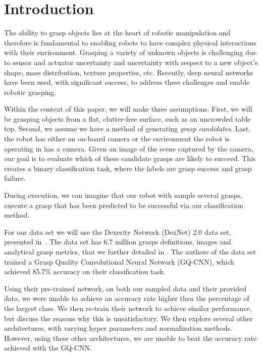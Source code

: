 
\section{Introduction}
\label{sec:intro}

The ability to grasp objects lies at the heart of robotic manipulation and therefore is fundamental to enabling robots to have complex physical interactions with their environment. 
Grasping a variety of unknown objects is challenging due to sensor and actuator uncertainty and uncertainty with respect to a new object's shape, mass distribution, texture properties, etc. 
Recently, deep neural networks have been used, with significant success, to address these challenges and enable robotic grasping. 

Within the context of this paper, we will make three assumptions. 
First, we will be grasping objects from a flat, clutter-free surface, such as an uncrowded table top. 
Second, we assume we have a method of generating \textit{grasp candidates}. 
Last, the robot has either an on-board camera or the environment the robot is operating in has a camera. 
Given an image of the scene captured by the camera, our goal is to evaluate which of these candidate grasps are likely to succeed. 
This creates a binary classification task, where the labels are grasp success and grasp failure. 

During execution, we can imagine that our robot with sample several grasps, execute a grasp that has been predicted to be successful via our classification method.  

For our data set we will use the Dexerity Network (DexNet) 2.0 data set, presented in~\cite{mahler2017dex}. 
The data set has 6.7 million grasps definitions, images and analytical grasp metrics, that we further detailed in . 
The authors of the data set trained a Grasp Quality Convolutional Neural Network (GQ-CNN), which achieved 85.7\% accuracy on their classification task.

Using their pre-trained network, on both our sampled data and their provided data, we were unable to achieve an accuracy rate higher then the percentage of the largest class. 
We then re-train their network to achieve similar performance, but discuss the reasons why this is unsatisfactory. 
We then explore several other architectures, with varying hyper parameters and normalization methods. 
However, using these other architectures, we are unable to beat the accuracy rate achieved with the GQ-CNN. 


